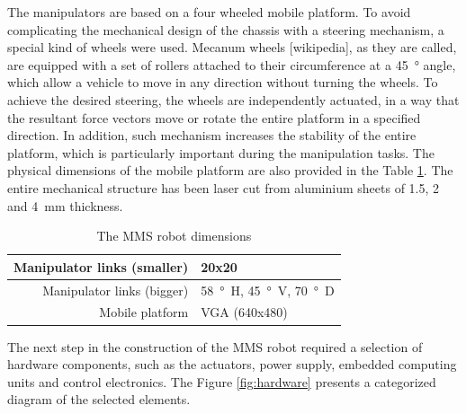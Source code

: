 The manipulators are based on a four wheeled mobile platform. To avoid complicating the mechanical design of the chassis with a steering mechanism, a special kind of wheels were used. Mecanum wheels [wikipedia], as they are called, are equipped with a set of rollers attached to their circumference at a \SI{45}{\degree} angle, which allow a vehicle to move in any direction without turning the wheels. To achieve the desired steering, the wheels are independently actuated, in a way that the resultant force vectors move or rotate the entire platform in a specified direction. In addition, such mechanism increases the stability of the entire platform, which is particularly important during the manipulation tasks. The physical dimensions of the mobile platform are also provided in the Table \ref{tab:dimensions}. The entire mechanical structure has been laser cut from aluminium sheets of \SI{1.5}{}, \SI{2}{} and \SI{4}{\milli\meter} thickness.

\begin{table}[H]

\begin{center}

\begin{tabular}{r||l}
\hline
Manipulator links  (smaller)    & 20x20 \\

\hline
Manipulator links  (bigger)        & \SI{58}{\degree H}, \SI{45}{\degree V}, \SI{70}{\degree D} \\

\hline
Mobile platform & VGA (640x480) \\

\hline
\end{tabular}
\caption{The MMS robot dimensions}
\label{tab:dimensions}
\end{center}
\end{table}


The next step in the construction of the MMS robot required a selection of hardware components, such as the actuators, power supply, embedded computing units and control electronics. The Figure \ref{fig:hardware} presents a categorized diagram of the selected elements. 

